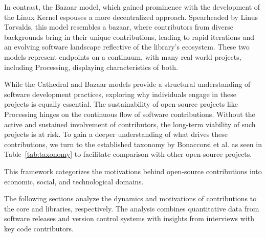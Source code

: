 In contrast, the Bazaar model, which gained prominence with the 
development of the Linux Kernel espouses a more decentralized approach. Spearheaded by Linus Torvalds, this model resembles a bazaar, where contributors from diverse backgrounds bring in their unique contributions, leading to rapid iterations and an evolving software landscape reflective of the library’s ecosystem. 
These two models represent endpoints on a continuum, with many real-world projects, including Processing, displaying characteristics of both. 

While the Cathedral and Bazaar models provide a structural understanding of software development practices, exploring why individuals engage in these projects is equally essential. The sustainability of open-source projects like Processing hinges on the continuous flow of software contributions. Without the active and sustained involvement of contributors, the long-term viability of such projects is at risk. To gain a deeper understanding of what drives these contributions, we turn to the established taxonomy by Bonaccorsi et al. as seen in Table~\ref{tab:taxonomy} \parencite{bonaccorsiComparingMotivationsIndividual2006} to facilitate comparison with other open-source projects.

This framework categorizes the motivations behind open‐source
contributions into economic, social, and technological domains.

The following sections analyze the dynamics and motivations of contributions to the core and libraries, respectively. The analysis combines quantitative data from software releases and version control systems with insights from interviews with key code contributors.

